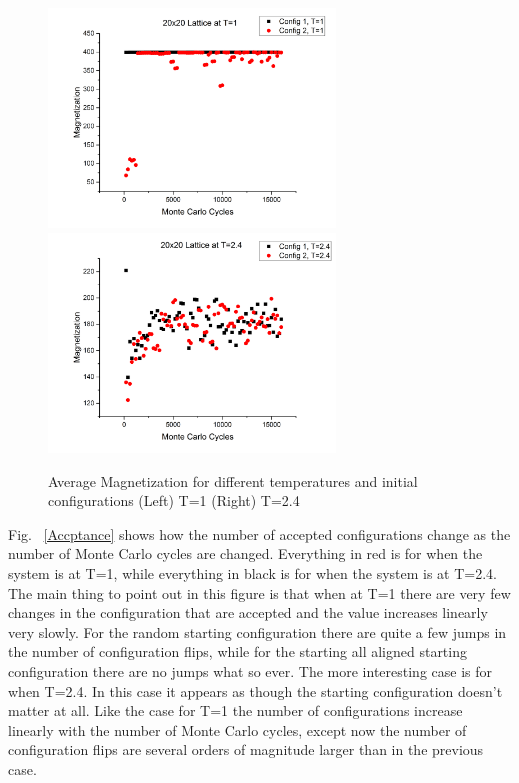 \documentclass[12pt,righttag]{article}
\begin{document}
		\begin{figure}
			
			\includegraphics[width=3in]{Graph03.png}
			\includegraphics[width=3in]{Graph04.png}
			
			
			\caption{\label{Magnetization} Average Magnetization for different temperatures and initial configurations (Left) T=1 (Right) T=2.4}
		\end{figure}
	Fig. ~\ref{Accptance} shows how the number of accepted configurations change as the number of Monte Carlo cycles are changed. Everything in red is for when the system is at T=1, while everything in black is for when the system is at T=2.4. The main thing to point out in this figure is that when at T=1 there are very few changes in the configuration that are accepted and the value increases linearly very slowly. For the random starting configuration there are quite a few jumps in the number of configuration flips, while for the starting all aligned starting configuration there are no jumps what so ever. The more interesting case is for when T=2.4. In this case it appears as though the starting configuration doesn't matter at all. Like the case for T=1 the number of configurations increase linearly with the number of Monte Carlo cycles, except now the number of configuration flips are several orders of magnitude larger than in the previous case.
\end{document}
